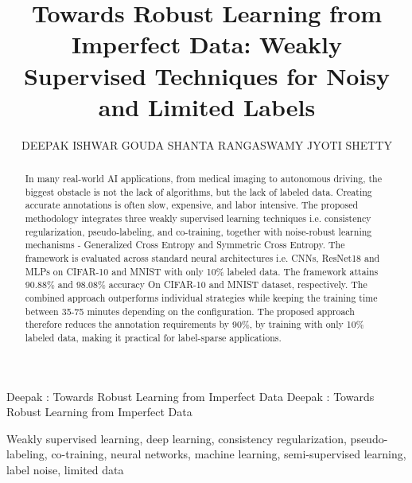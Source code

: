 \documentclass{ieeeaccess}
\begin{document}

\title{Towards Robust Learning from Imperfect Data: Weakly Supervised Techniques for Noisy and Limited Labels}
\author{\uppercase{Deepak Ishwar Gouda} \uppercase{Shanta Rangaswamy} \uppercase{Jyoti Shetty}}
\address[1]{Computer Science and Engineering, RV College of Engineering®, Bengaluru, India}
\address[2]{Computer Science and Engineering, RV College of Engineering®, Bengaluru, India }
\address[3]{Computer Science and Engineering, RV College of Engineering®, Bengaluru, India }

\markboth
{Deepak \headeretal: Towards Robust Learning from Imperfect Data}
{Deepak \headeretal: Towards Robust Learning from Imperfect Data}


\begin{abstract}
In many real-world AI applications, from medical imaging to autonomous driving, the biggest obstacle is not the lack of algorithms, but the lack of labeled data. Creating accurate annotations is often slow, expensive, and labor intensive. The proposed methodology integrates three weakly supervised learning techniques i.e. consistency regularization, pseudo-labeling, and co-training, together with noise-robust learning mechanisms - Generalized Cross Entropy and Symmetric Cross Entropy. The framework is evaluated across standard neural architectures i.e. CNNs, ResNet18 and MLPs on CIFAR-10 and MNIST with only 10\% labeled data.  The framework attains {90.88\%} and {98.08\%} accuracy On CIFAR-10 and MNIST dataset, respectively. The combined approach outperforms individual strategies while keeping the training time between 35-75 minutes depending on the configuration. The proposed approach therefore reduces the annotation requirements by 90\%, by training with only 10\% labeled data, making it practical for label-sparse applications. 
\end{abstract}

\begin{keywords}
Weakly supervised learning, deep learning, consistency regularization, pseudo-labeling, co-training, neural networks, machine learning, semi-supervised learning, label noise, limited data
\end{keywords}
\end{document}

